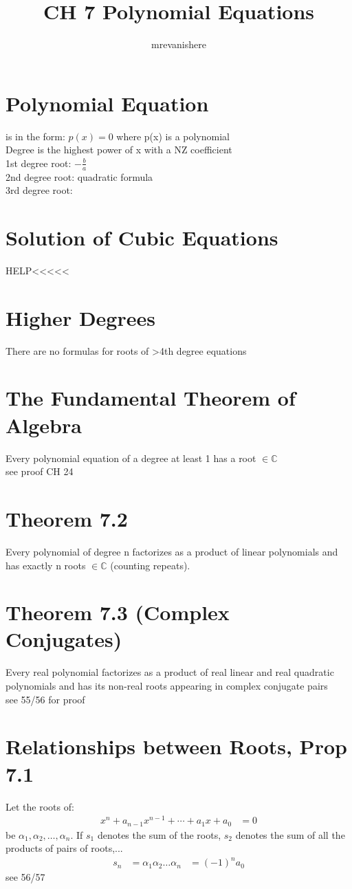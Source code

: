 \documentclass[12pt]{article}
\newcommand{\C}{\mathbb{C}}
\begin{document}
\title{CH 7 Polynomial Equations}
\author{mrevanishere}
\maketitle


\section{Polynomial Equation}
	is in the form: $ p(x) = 0 $ where p(x) is a polynomial\\
	Degree is the highest power of x with a NZ coefficient \\
	1st degree root: $ -\frac{b}{a} $ \\
	2nd degree root: quadratic formula \\
	3rd degree root:
\section{Solution of Cubic Equations}
	HELP<<<<<
\section{Higher Degrees}
	There are no formulas for roots of >4th degree equations
\section{The Fundamental Theorem of Algebra}
	Every polynomial equation of a degree at least 1 has a root $ \in\C $\\
	see proof CH 24
\section{Theorem 7.2}
	Every polynomial of degree n factorizes as a product of linear
	polynomials and has exactly n roots $ \in\C $ (counting repeats).
\section{Theorem 7.3 (Complex Conjugates)}
	Every real polynomial factorizes as a product of real linear and real
	quadratic polynomials and has its non-real roots appearing in 
	complex conjugate pairs\\
	see 55/56 for proof
\section{Relationships between Roots, Prop 7.1}
	Let the roots of:
	\begin{align*}
		x^n + a_{n-1}x^{n-1}+\cdots+a_1x+a_0 &= 0
	\end{align*}
	be $ \alpha_1, \alpha_2,\dots, \alpha_n $. If $ s_1 $ denotes the
	sum of the roots, $ s_2 $ denotes the sum of all the products
	of pairs of roots,...
	\begin{align*}
		s_n &= \alpha_1\alpha_2\dots\alpha_n &= (-1)^{n}a_0
	\end{align*}
	see 56/57
\end{document}
